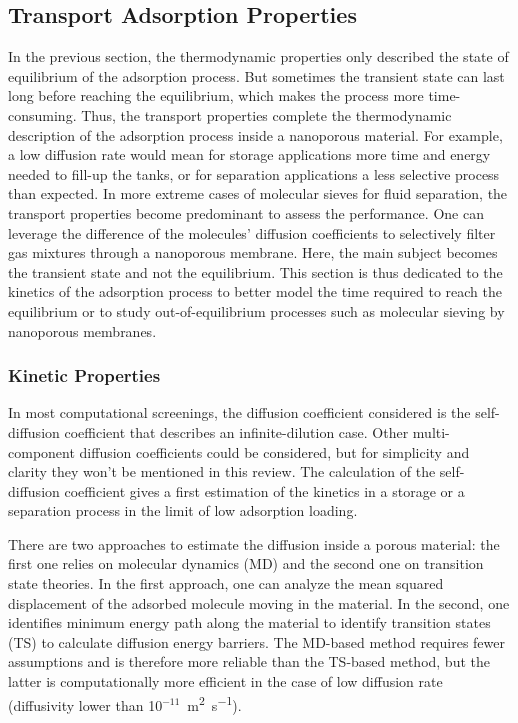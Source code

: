 \documentclass[main.tex]{subfiles}
\begin{document}
\subsection{Transport Adsorption Properties}

In the previous section, the thermodynamic properties only described the state of equilibrium of the adsorption process. But sometimes the transient state can last long before reaching the equilibrium, which makes the process more time-consuming. Thus, the transport properties complete the thermodynamic description of the adsorption process inside a nanoporous material. For example, a low diffusion rate would mean for storage applications more time and energy needed to fill-up the tanks, or for separation applications a less selective process than expected. In more extreme cases of molecular sieves for fluid separation, the transport properties become predominant to assess the performance. One can leverage the difference of the molecules' diffusion coefficients to selectively filter gas mixtures through a nanoporous membrane.\cite{Miandoab_2021} Here, the main subject becomes the transient state and not the equilibrium. This section is thus dedicated to the kinetics of the adsorption process to better model the time required to reach the equilibrium or to study out-of-equilibrium processes such as molecular sieving by nanoporous membranes.

\subsubsection{Kinetic Properties}

In most computational screenings, the diffusion coefficient considered is the self-diffusion coefficient that describes an infinite-dilution case. Other multi-component diffusion coefficients could be considered, but for simplicity and clarity they won't be mentioned in this review. The calculation of the self-diffusion coefficient gives a first estimation of the kinetics in a storage or a separation process in the limit of low adsorption loading.

There are two approaches to estimate the diffusion inside a porous material: the first one relies on molecular dynamics (MD) and the second one on transition state theories. In the first approach, one can analyze the mean squared displacement of the adsorbed molecule moving in the material. In the second, one identifies minimum energy path along the material to identify transition states (TS) to calculate diffusion energy barriers. The MD-based method requires fewer assumptions and is therefore more reliable than the TS-based method, but the latter is computationally more efficient in the case of low diffusion rate (diffusivity lower than 10$^{-11}$~\si{\square\meter\per\second}).
\end{document}

